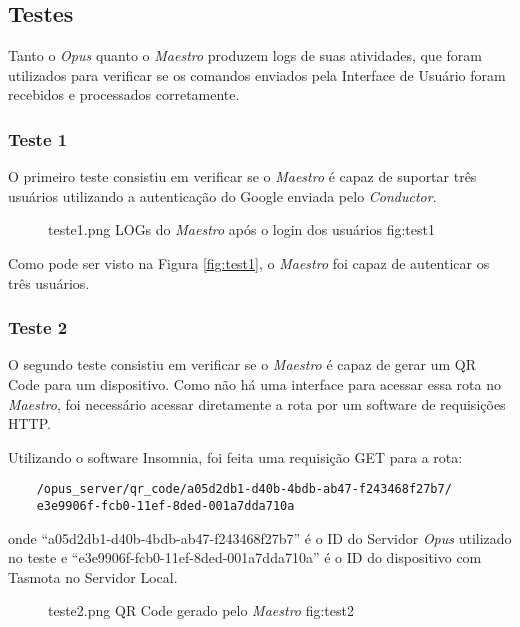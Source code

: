 \subsection{Testes}

Tanto o \emph{Opus} quanto o \emph{Maestro} produzem logs de suas atividades, que foram utilizados para verificar se os comandos enviados
pela Interface de Usuário foram recebidos e processados corretamente.

\subsubsection{Teste 1}
O primeiro teste consistiu em verificar se o \emph{Maestro} é capaz de suportar três usuários utilizando a autenticação do Google enviada pelo
\emph{Conductor}.

\begin{figure}[h!]
    {teste1.png}
    {LOGs do \emph{Maestro} após o login dos usuários}
    {fig:test1}
\end{figure}

Como pode ser visto na Figura \ref{fig:test1}, o \emph{Maestro} foi capaz de autenticar os três usuários.

\subsubsection{Teste 2}
O segundo teste consistiu em verificar se o \emph{Maestro} é capaz de gerar um QR Code para um dispositivo. Como não há uma interface para 
acessar essa rota no \emph{Maestro}, foi necessário acessar diretamente a rota por um software de requisições HTTP.

Utilizando o software Insomnia, foi feita uma requisição GET para a rota:
\begin{lstlisting}
    /opus_server/qr_code/a05d2db1-d40b-4bdb-ab47-f243468f27b7/
    e3e9906f-fcb0-11ef-8ded-001a7dda710a
\end{lstlisting}
onde ``a05d2db1-d40b-4bdb-ab47-f243468f27b7'' 
é o ID do Servidor \emph{Opus} utilizado no teste e ``e3e9906f-fcb0-11ef-8ded-001a7dda710a'' é o ID do dispositivo com Tasmota no Servidor Local.

\begin{figure}[h!]
    {teste2.png}
    {QR Code gerado pelo \emph{Maestro}}
    {fig:test2}
\end{figure}

